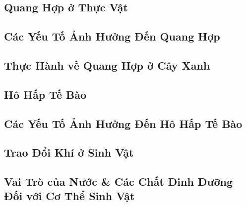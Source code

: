 \documentclass{article}
\numberwithin{equation}{section}
\begin{document}

\subsection{Quang Hợp ở Thực Vật}


\subsection{Các Yếu Tố Ảnh Hưởng Đến Quang Hợp}


\subsection{Thực Hành về Quang Hợp ở Cây Xanh}


\subsection{Hô Hấp Tế Bào}


\subsection{Các Yếu Tố Ảnh Hưởng Đến Hô Hấp Tế Bào}


\subsection{Trao Đổi Khí ở Sinh Vật}


\subsection{Vai Trò của Nước \& Các Chất Dinh Dưỡng Đối với Cơ Thể Sinh Vật}

\end{document}
